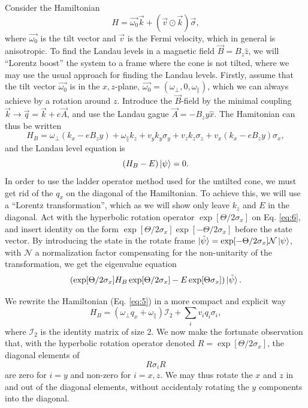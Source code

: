 Consider the Hamiltonian
\begin{equation}
  \label{eq:4}
  H = \vec{\omega_{0}} \vec{k} + (\vec{v} \odot \vec{k}) \vec{\sigma},
\end{equation}
where \(\vec{\omega_{0}}\) is the tilt vector and \(\vec{v}\) is the Fermi velocity, which in general is anisotropic.
To find the Landau levels in a magnetic field \(\vec{B} = B_{z}\hat{z} \), we will ``Lorentz boost'' the system to a frame where the cone is not tilted, where we may use the usual approach for finding the Landau levels.
Firstly, assume that the tilt vector \(\vec{\omega_{0}}\) is in the \(x,z\)-plane, \(\vec{\omega_{0}} = (\omega_{\perp}, 0, \omega_{\parallel})\), which we can always achieve by a rotation around \(z\).
Introduce the \(\vec{B}\)-field by the minimal coupling \(\vec{k} \to \vec{q} = \vec{k} + e \vec{A}\), and use the Landau gague \(\vec{A} = -B_{z}y \hat{x}\).
The Hamitonian can thus be written
\begin{equation}
  \label{eq:5}
  H_{B} = \omega _{\perp} \left(k_{x} - e B_{z} y \right) + \omega _{\parallel} k_{z} + v_{y} k_{y} \sigma _{y} + v_{z} k_{z} \sigma _{z} + v_{x} \left(k_{x} - e B_{z} y\right) \sigma _{x},
\end{equation}
and the Landau level equation is
\begin{equation}
  \label{eq:6}
  \left(H_{B} - E\right) \ket{\psi } = 0.
\end{equation}
In order to use the ladder operator method used for the untilted cone, we must get rid of the \(q_{x}\) on the diagonal of the Hamiltonian.
To achieve this, we will use a ``Lorentz transformation'', which as we will show only leave \(k_{z}\) and \(E\) in the diagonal.
Act with the hyperbolic rotation operator \(\exp[\Theta /2 \sigma_{x}]\) on Eq. \eqref{eq:6}, and insert identity on the form \(\exp[\Theta /2 \sigma_{x}]\exp[-\Theta /2 \sigma_{x}]\) before the state vector.
By introducing the state in the rotate frame \(\ket{\tilde{\psi}} = \exp[- \Theta /2 \sigma_{x}] \mathcal{N} \ket{\psi } \), with \(\mathcal{N}\) a normalization factor compensating for the non-unitarity of the transformation, we get the eigenvalue equation
\begin{equation}
  \label{eq:7}
  (\exp[\Theta /2 \sigma_{x}] H_{B}\exp[\Theta /2 \sigma_{x}] - E \exp[\Theta \sigma_{x}]) \ket{\tilde{\psi}}.
\end{equation}

We rewrite the Hamiltonian (Eq. \eqref{eq:5}) in a more compact and explicit way
\begin{equation}
  \label{eq:8}
  H_{B} = \left(\omega _{\perp} q_{x} + \omega _{\parallel}\right) \mathcal{I}_2 + \sum_i v_{i} q_{i} \sigma _{i},
\end{equation}
where \(\mathcal{I}_{2}\) is the identity matrix of size 2.
We now make the fortunate observation that, with the hyperbolic rotation operator denoted \( R = \exp [\Theta / 2 \sigma_{x}]\), the diagonal elements of
\[
R \sigma_{i} R
\]
are zero for $i=y$ and non-zero for \(i=x,z\).
We may thus rotate the \(x\) and \(z\) in and out of the diagonal elements, without accidentaly rotating the \(y\) components into the diagonal.

